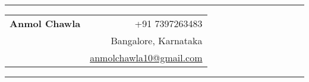 \documentclass[12pt]{article}
\newcommand{\primarycolor}{ForestGreen}
\newcommand{\spacedhrule}[1]{
    \vspace{1ex}
    \hrule
    \vspace{#1}
}
\newcommand{\designation}{Software Engineer}
\begin{document}
    \hrule
    \vspace{2ex}

    \begin{center}
        \begin{tabularx}{\textwidth}{>{\raggedright\arraybackslash}Xr}
            \textbf{\Huge{Anmol Chawla}} \vspace{1ex} & {+91 7397263483} \\
            \multirow{2}{*}{\LARGE{\color{\primarycolor}\designation}} & {Bangalore, Karnataka} \\
            & {\href{mailto:anmolchawla10@gmail.com}{anmolchawla10@gmail.com}} \\
        \end{tabularx}
    \end{center}

    \vspace{-1.2ex}
    \spacedhrule{2ex}
\end{document}
